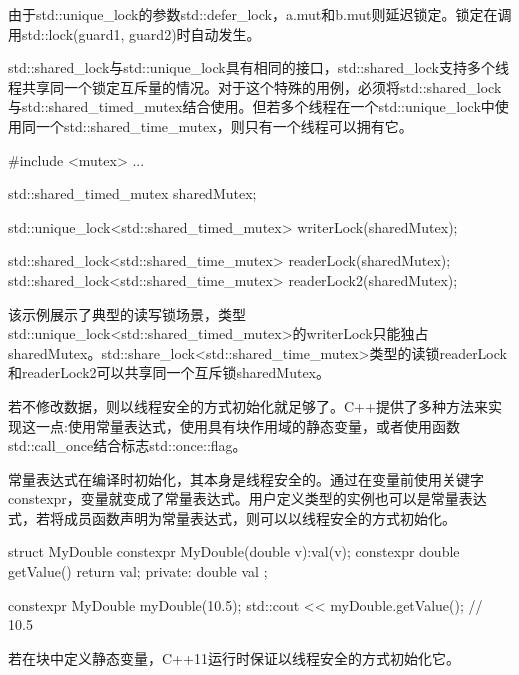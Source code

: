 由于std::unique\_lock的参数std::defer\_lock，a.mut和b.mut则延迟锁定。锁定在调用std::lock(guard1, guard2)时自动发生。



std::shared\_lock与std::unique\_lock具有相同的接口，std::shared\_lock支持多个线程共享同一个锁定互斥量的情况。对于这个特殊的用例，必须将std::shared\_lock与std::shared\_timed\_mutex结合使用。但若多个线程在一个std::unique\_lock中使用同一个std::shared\_time\_mutex，则只有一个线程可以拥有它。

\begin{cpp}
#include <mutex>
...

std::shared_timed_mutex sharedMutex;

std::unique_lock<std::shared_timed_mutex> writerLock(sharedMutex);

std::shared_lock<std::shared_time_mutex> readerLock(sharedMutex);
std::shared_lock<std::shared_time_mutex> readerLock2(sharedMutex);
\end{cpp}

该示例展示了典型的读写锁场景，类型std::unique\_lock<std::shared\_timed\_mutex>的writerLock只能独占sharedMutex。std::share\_lock<std::shared\_time\_mutex>类型的读锁readerLock和readerLock2可以共享同一个互斥锁sharedMutex。


若不修改数据，则以线程安全的方式初始化就足够了。C++提供了多种方法来实现这一点:使用常量表达式，使用具有块作用域的静态变量，或者使用函数std::call\_once结合标志std::once::flag。


常量表达式在编译时初始化，其本身是线程安全的。通过在变量前使用关键字constexpr，变量就变成了常量表达式。用户定义类型的实例也可以是常量表达式，若将成员函数声明为常量表达式，则可以以线程安全的方式初始化。

\begin{cpp}
struct MyDouble{
	constexpr MyDouble(double v):val(v){};
	constexpr double getValue(){ return val; }
private:
	double val
};

constexpr MyDouble myDouble(10.5);
std::cout << myDouble.getValue(); // 10.5
\end{cpp}


若在块中定义静态变量，C++11运行时保证以线程安全的方式初始化它。

